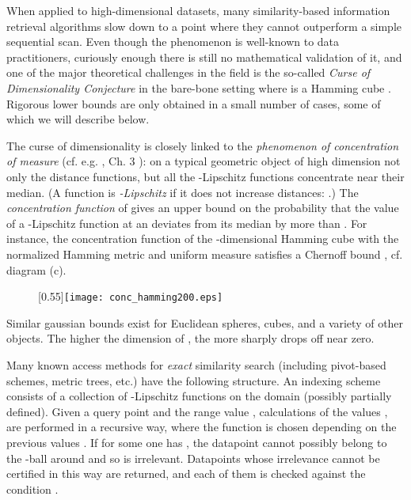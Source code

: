 \documentclass[12pt]{article}
\begin{document}
When applied to high-dimensional datasets, many similarity-based information retrieval algorithms slow down to a point where they cannot outperform a simple sequential scan. Even though the phenomenon is well-known to data practitioners, curiously enough there is still no mathematical validation of it, and one of the major theoretical challenges in the field is the so-called {\em Curse of Dimensionality Conjecture} in the bare-bone setting where  is a Hamming cube \cite{indyk:04}. Rigorous lower bounds are only obtained in a small number of cases, some of which we will describe below.

\smallskip
{}
The curse of dimensionality is closely linked to the {\em phenomenon of concentration of measure} (cf. e.g. \cite{gromov:99}, Ch. 3 ): on a typical geometric object  of high dimension not only the distance functions, but all the -Lipschitz functions  concentrate near their median. (A function is {\em -Lipschitz} if it does not increase distances: .)
The {\em concentration function}  of  gives an upper bound on the probability that the value of a -Lipschitz function  at an  deviates from its median by more than . For instance, the concentration function of the -dimensional Hamming cube  with the normalized Hamming metric and uniform measure satisfies a Chernoff bound , cf. diagram (c).
\begin{figure}[ht]
\begin{center}
\scalebox{0.55}[0.55]{\texttt{[image: conc\_hamming200.eps]}} 
\hskip 0.8cm
\end{center}
\end{figure}  Similar gaussian bounds exist for Euclidean spheres, cubes, and a variety of other objects. The higher the dimension of , the more sharply  drops off near zero. 

\smallskip
{}
Many known access methods for {\em exact} similarity search (including pivot-based schemes, metric trees, etc.) have the following structure. An indexing scheme consists of a collection of  -Lipschitz functions  on the domain  (possibly partially defined). Given a query point  and the range value , calculations of the values ,  are performed in a recursive way, where the function  is chosen depending on the previous values . If for some  one has , the datapoint  cannot possibly belong to the -ball around  and so is irrelevant. Datapoints  whose irrelevance cannot be certified in this way are returned, and each of them is checked against the condition . 
\end{document}
